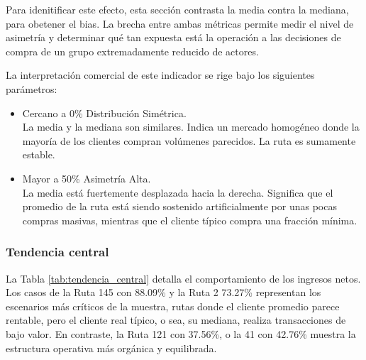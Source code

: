 \documentclass[12pt, letterpaper]{article}
\begin{document}
Para idenitificar este efecto, esta sección contrasta la media contra la mediana, para obetener el \gls{bias}.
La brecha entre ambas métricas permite medir el nivel de asimetría y determinar qué tan expuesta está
la operación a las decisiones de compra de un grupo extremadamente reducido de actores.

La interpretación comercial de este indicador se rige bajo los siguientes parámetros:
\begin{itemize}
    \item Cercano a 0\% Distribución Simétrica.\\ La media y la mediana son similares. Indica un mercado homogéneo donde la mayoría de los clientes compran volúmenes parecidos. La ruta es sumamente estable.
    \item Mayor a 50\% Asimetría Alta.\\ La media está fuertemente desplazada hacia la derecha. Significa que el promedio de la ruta está siendo sostenido artificialmente por unas pocas compras masivas, mientras que el cliente típico compra una fracción mínima.
\end{itemize}


\subsubsection{Tendencia central}
La Tabla \ref{tab:tendencia_central} detalla el comportamiento de los ingresos netos.
Los casos de la Ruta 145 con 88.09\% y la Ruta 2 73.27\% representan los escenarios más críticos de la muestra,
rutas donde el cliente promedio parece rentable, pero el cliente real típico, o sea, su mediana, realiza transacciones de bajo valor.
En contraste, la Ruta 121 con 37.56\%, o la 41 con 42.76\% muestra la estructura operativa más orgánica y equilibrada.
\end{document}
